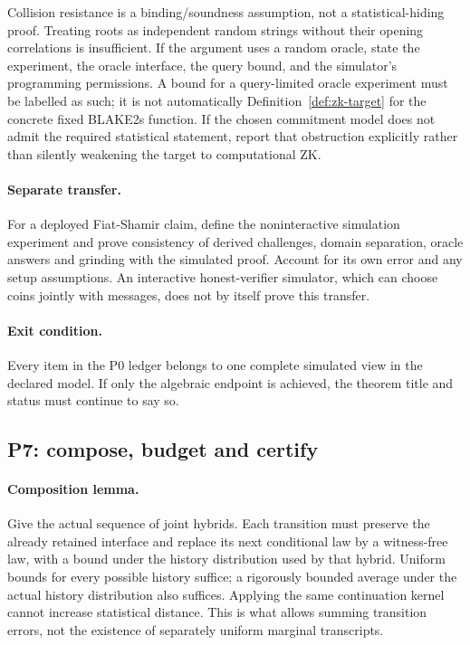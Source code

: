 Collision resistance is a binding/soundness assumption, not a statistical-hiding proof. Treating roots as independent random strings without their opening correlations is insufficient. If the argument uses a random oracle, state the experiment, the oracle interface, the query bound, and the simulator's programming permissions. A bound for a query-limited oracle experiment must be labelled as such; it is not automatically Definition~\ref{def:zk-target} for the concrete fixed BLAKE2s function. If the chosen commitment model does not admit the required statistical statement, report that obstruction explicitly rather than silently weakening the target to computational ZK.

\paragraph{Separate transfer.} For a deployed Fiat-Shamir claim, define the noninteractive simulation experiment and prove consistency of derived challenges, domain separation, oracle answers and grinding with the simulated proof. Account for its own error and any setup assumptions. An interactive honest-verifier simulator, which can choose coins jointly with messages, does not by itself prove this transfer.

\paragraph{Exit condition.} Every item in the P0 ledger belongs to one complete simulated view in the declared model. If only the algebraic endpoint is achieved, the theorem title and status must continue to say so.

\subsection{P7: compose, budget and certify}

\paragraph{Composition lemma.} Give the actual sequence of joint hybrids. Each transition must preserve the already retained interface and replace its next conditional law by a witness-free law, with a bound under the history distribution used by that hybrid. Uniform bounds for every possible history suffice; a rigorously bounded average under the actual history distribution also suffices. Applying the same continuation kernel cannot increase statistical distance. This is what allows summing transition errors, not the existence of separately uniform marginal transcripts.

